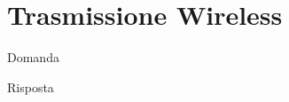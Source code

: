 \section{Trasmissione Wireless}

\begin{questions}
    \question Domanda
    
    \begin{solution}
        Risposta
    \end{solution}
\end{questions}